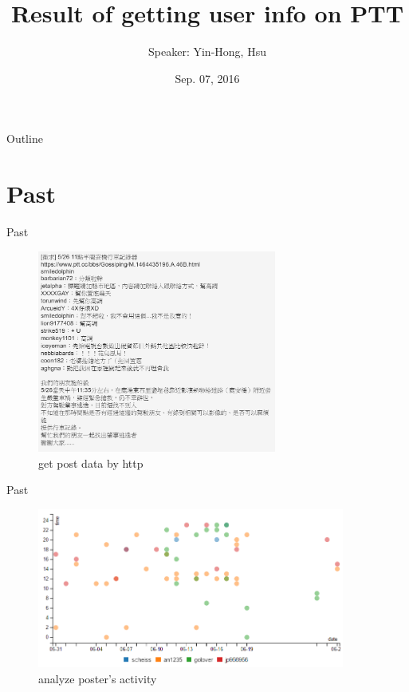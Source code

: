 \documentclass{beamer}
\title {
    Result of getting user info on PTT
}
\author {
    Speaker: Yin-Hong, Hsu
}
\date {
    Sep. 07, 2016 %
}
\begin{document}
\begin{frame}
    \titlepage
\end{frame}

\begin{frame}{Outline}
    \tableofcontentsgather
    \tableofcontents
\end{frame}

\section{Past}
\begin{frame}{Past}
\begin{figure}[t]
    \centering
    \includegraphics[width=0.7\textwidth]{figures/format.png}
    \caption{get post data by http}
\end{figure}
\end{frame}

\begin{frame}{Past}
\begin{figure}[t]
    \centering
    \includegraphics[width=0.9\textwidth]{figures/time.png}
    \caption{ analyze poster's activity }
\end{figure}
\end{frame}
\end{document}
